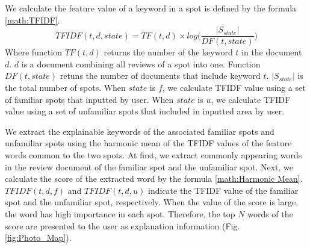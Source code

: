 \documentclass[journal]{IAENGtran}
\begin{document}
We calculate the feature value of a keyword in a spot is defined by the formula \ref{math:TFIDF}.
\begin{equation}
  TFIDF(t,d,state) = TF(t,d) \times log\Biggr(\frac{|S_{state}|}{DF(t,state)}\Biggr)
  \label{math:TFIDF}
\end{equation}
Where function $TF(t,d)$ returns the number of the keyword $t$ in the document $d$.
$d$ is a document combining all reviews of a spot into one.
Function $DF(t,state)$ retuns the number of documents that include keyword $t$.
$|S_{state}|$ is the total number of spots.
When $state$ is $f$, we calculate TFIDF value using a set of familiar spots that inputted by user.
When $state$ is $u$, we calculate TFIDF value using a set of unfamiliar spots that included in inputted area by user.

We extract the explainable keywords of the associated familiar spots and unfamiliar spots using the harmonic mean of the TFIDF values ​​of the feature words common to the two spots.
At first, we extract commonly appearing words in the review document of the familiar spot and the unfamiliar spot.
Next, we calculate the score of the extracted word by the formula \ref{math:Harmonic Mean}.
$TFIDF(t,d,f)$ and $TFIDF(t,d,u)$ indicate the TFIDF value of the familiar spot and the unfamiliar spot, respectively.
When the value of the score is large, the word has high importance in each spot.
Therefore, the top $N$ words of the score are presented to the user as explanation information (Fig. \ref{fig:Photo_Map}).
\end{document}
